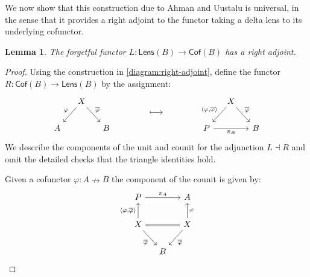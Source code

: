 \documentclass[colorlinks = true, a4paper, oneside, reqno, 11pt]{amsart}
\newtheorem{lemma}[theorem]{Lemma}
\theoremstyle{definition}
\theoremstyle{remark}
\newcommand{\Cof}{\mathsf{Cof}}
\newcommand{\Lens}{\mathsf{Lens}}
\newcommand{\phibar}{\overline{\varphi}}
\begin{document}
We now show that this construction due to Ahman and Uustalu is universal, in the 
sense that it provides a right adjoint to the functor taking a delta lens to its underlying
cofunctor. 

\begin{lemma}\label{lemma:right-adjoint}
The forgetful functor $L \colon \Lens(B) \rightarrow \Cof(B)$ has a right adjoint.
\end{lemma}
\begin{proof}
Using the construction in \eqref{diagram:right-adjoint}, define the functor 
$R \colon \Cof(B) \rightarrow \Lens(B)$ by the assignment: 
\begin{equation}
\begin{tikzcd}[column sep = small]
& X 
\arrow[ld, "\varphi"']
\arrow[rd, "\phibar"]
& 
\\
A & & B
\end{tikzcd}
\qquad \qquad \longmapsto \qquad \qquad
\begin{tikzcd}[column sep = small]
& X 
\arrow[ld, "{\langle \varphi, \phibar \rangle}"']
\arrow[rd, "\phibar"]
& 
\\
P
\arrow[rr, "\pi_{B}"']
& & B
\end{tikzcd}
\end{equation}
We describe the components of the unit and counit for the adjunction $L \dashv R$ 
and omit the detailed checks that the triangle identities hold. 

Given a cofunctor $\varphi \colon A \nrightarrow B$ the component of the counit is 
given by: 
\begin{equation}
\begin{tikzcd}[column sep = small]
P 
\arrow[rr, "\pi_{A}"]
& & A
\\
X
\arrow[u, "{\langle \varphi, \phibar \rangle}"]
\arrow[rr, equal]
\arrow[rd, "\phibar"']
& & X 
\arrow[u, "\varphi"']
\arrow[ld, "\phibar"]
\\
& B &
\end{tikzcd}
\end{equation}


\end{proof}
\end{document}
